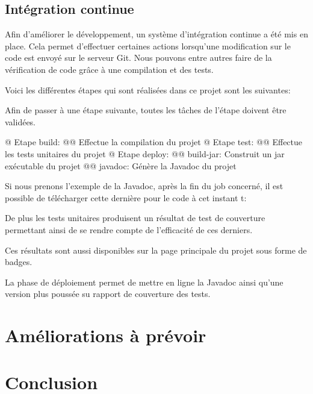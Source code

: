 \documentclass[final, noposter]{polytech/polytech}
\begin{document}
	\section{Intégration continue} 
		Afin d'améliorer le développement, un système d'intégration continue a été mis en place.
	Cela permet d'effectuer certaines actions lorsqu'une modification sur le code est envoyé sur le serveur Git.
	Nous pouvons entre autres faire de la vérification de code grâce à une compilation et des tests.
	
	Voici les différentes étapes qui sont réalisées dans ce projet sont les suivantes:
	
	Afin de passer à une étape suivante, toutes les tâches de l'étape doivent être validées.
		
	\begin{easylist}[itemize]
		@ Etape build:
		@@ Effectue la compilation du projet
		@ Etape test:
		@@ Effectue les tests unitaires du projet
		@ Etape deploy:
		@@ build-jar: Construit un jar exécutable du projet
		@@ javadoc: Génère la Javadoc du projet
	\end{easylist}
	
	Si nous prenons l'exemple de la Javadoc, après la fin du job concerné, il est possible de télécharger cette dernière pour le code à cet instant t:
	
	De plus les tests unitaires produisent un résultat de test de couverture permettant ainsi de se rendre compte de l'efficacité de ces derniers. 
	
	Ces résultats sont aussi disponibles sur la page principale du projet sous forme de badges.
	
	La phase de déploiement permet de mettre en ligne la Javadoc ainsi qu'une version plus poussée su rapport de couverture des tests.

\chapter{Améliorations à prévoir}

\chapter{Conclusion}
\end{document}

